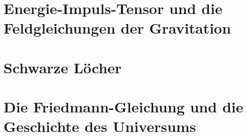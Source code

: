 %
%
\section{Energie-Impuls-Tensor und die Feldgleichungen der Gravitation
\label{buch:kruemmung:section:gravitation}}

%
%
\section{Schwarze Löcher
\label{buch:kruemmung:section:schwarzesloch}}

%
%
\section{Die Friedmann-Gleichung und die Geschichte des Universums
\label{buch:kruemmung:section:friedmann}}

